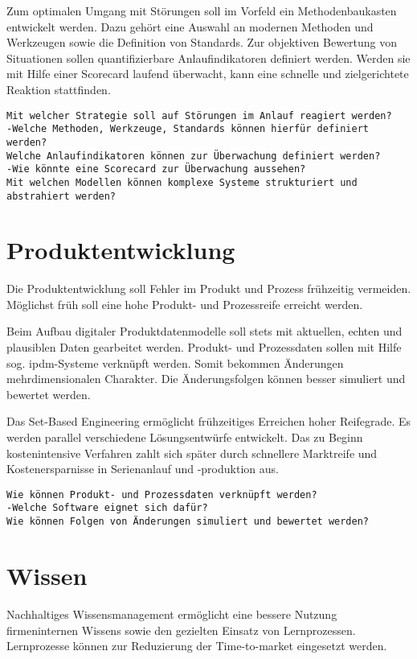 Zum optimalen Umgang mit Störungen soll im Vorfeld ein Methodenbaukasten entwickelt werden. Dazu gehört eine Auswahl an modernen Methoden und Werkzeugen sowie die Definition von Standards. Zur objektiven Bewertung von Situationen sollen quantifizierbare Anlaufindikatoren definiert werden. Werden sie mit Hilfe einer Scorecard laufend überwacht, kann eine schnelle und zielgerichtete Reaktion stattfinden. 

\begin{verbatim}
Mit welcher Strategie soll auf Störungen im Anlauf reagiert werden? 
-Welche Methoden, Werkzeuge, Standards können hierfür definiert werden? 
Welche Anlaufindikatoren können zur Überwachung definiert werden? 
-Wie könnte eine Scorecard zur Überwachung aussehen? 
Mit welchen Modellen können komplexe Systeme strukturiert und
abstrahiert werden? 
\end{verbatim}


\section{Produktentwicklung}

Die Produktentwicklung soll Fehler im Produkt und Prozess frühzeitig vermeiden. Möglichst früh soll eine hohe Produkt- und Prozessreife erreicht werden. 

Beim Aufbau digitaler Produktdatenmodelle soll stets mit aktuellen, echten und plausiblen Daten gearbeitet werden. Produkt- und Prozessdaten sollen mit Hilfe sog. \gls{ipdm}-Systeme verknüpft werden. Somit bekommen Änderungen mehrdimensionalen Charakter. Die Änderungsfolgen können besser simuliert und bewertet werden. 

Das Set-Based Engineering ermöglicht frühzeitiges Erreichen hoher Reifegrade. Es werden parallel verschiedene Lösungsentwürfe entwickelt. Das zu Beginn kostenintensive Verfahren zahlt sich später durch schnellere Marktreife und Kostenersparnisse in Serienanlauf und -produktion aus. 

\begin{verbatim}
Wie können Produkt- und Prozessdaten verknüpft werden? 
-Welche Software eignet sich dafür?
Wie können Folgen von Änderungen simuliert und bewertet werden?
\end{verbatim}


\section{Wissen}

Nachhaltiges Wissensmanagement ermöglicht eine bessere Nutzung firmeninternen Wissens sowie den gezielten Einsatz von Lernprozessen. Lernprozesse können zur Reduzierung der Time-to-market eingesetzt werden. 


